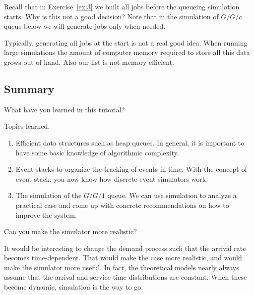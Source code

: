 \begin{exercise}
  Recall that in Exercise~\ref{ex:3} we built all jobs before the queueing simulation starts. Why is this not a good decision? Note that in the simulation of $G/G/c$ queue below we will generate jobs only when needed.
\begin{solution}
    Typically, generating all jobs at the start is not a real good idea. When running large simulations the amount of computer memory required to store all this data grows out of hand. Also our  list is not memory efficient.
  \end{solution}
\end{exercise}


\subsection{Summary }
\label{sec:summary-}

\begin{exercise}
  What have you learned in this tutorial?
\begin{solution}
    Topics learned.
    \begin{enumerate}
    \item Efficient data structures such as heap queues. In general, it is important to have some basic knowledge of algorithmic complexity.
    \item Event stacks to organize the tracking of events in time. With the concept of event stack, you now know how discrete event simulators work.
    \item The simulation of the $G/G/1$ queue.
      We  can use simulation to analyze a practical case and come up with concrete recommendations on how to improve the system.
    \end{enumerate}
  \end{solution}
\end{exercise}


\begin{exercise}
Can you make the simulator more realistic?
\begin{solution}
  It would be interesting to change the demand process such that the arrival rate becomes time-dependent.
  That would make the case more realistic, and would make the simulator more useful.
  In fact, the theoretical models nearly always assume that the arrival and service time distributions are constant.
  When these become dynamic, simulation is the way to go.
\end{solution}
\end{exercise}

